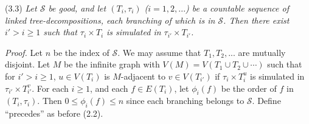 \stmt
(3.3) \textit{Let $\mathscr{S}$ be good, and let $(T_i, \tau_i)$ ($i = 1, 2, ...$) be a countable sequence of linked tree-decompositions, each branching of which is in $\mathscr{S}$. Then there exist $i' > i \ge 1$ such that $\tau_i \times T_i$ is simulated in $\tau_{i'} \times T_{i'}$.}

\textit{Proof.} Let $n$ be the index of $\mathscr{S}$. We may assume that $T_1, T_2, ...$ are mutually disjoint. Let $M$ be the infinite graph with $V(M) = V(T_1 \cup T_2 \cup \cdots)$ such that for $i' > i \ge 1$, $u \in V(T_i)$ is $M$-adjacent to $v \in V(T_{i'})$ if $\tau_i \times T_i^u$ is simulated in $\tau_{i'} \times T_{i'}^v$. For each $i \ge 1$, and each $f \in E(T_i)$, let $\phi_i(f)$ be the order of $f$ in $(T_i, \tau_i)$. Then $0 \le \phi_i(f) \le n$ since each branching belongs to $\mathscr{S}$. Define ``precedes'' as before (2.2).
